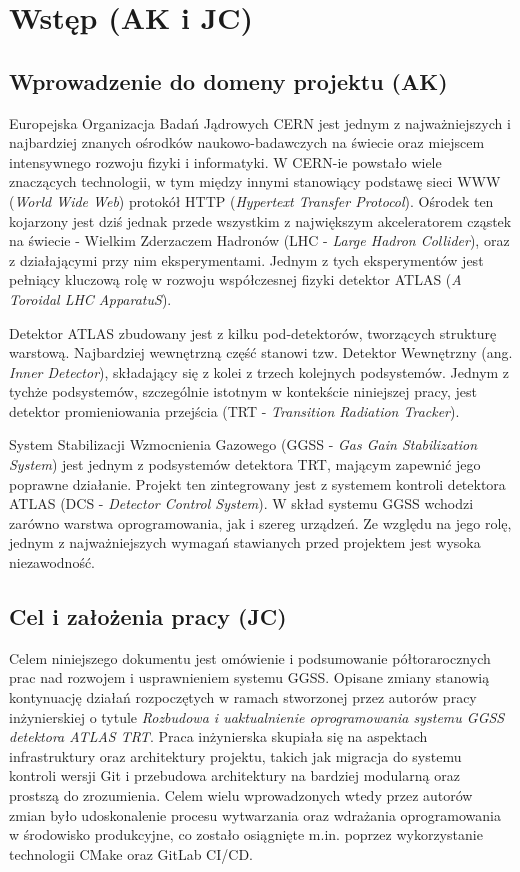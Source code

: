 \chapter{Wstęp (AK i JC)}
\label{cha:wstep}

\section{Wprowadzenie do domeny projektu (AK)}

Europejska Organizacja Badań Jądrowych CERN jest jednym z najważniejszych i najbardziej znanych ośrodków naukowo-badawczych na świecie oraz miejscem intensywnego rozwoju fizyki i informatyki. W CERN-ie powstało wiele znaczących technologii, w tym między innymi stanowiący podstawę sieci WWW (\emph{World Wide Web}) protokół HTTP (\emph{Hypertext Transfer Protocol}). Ośrodek ten kojarzony jest dziś jednak przede wszystkim z największym akceleratorem cząstek na świecie - Wielkim Zderzaczem Hadronów (LHC - \emph{Large Hadron Collider}), oraz z działającymi przy nim eksperymentami. Jednym z tych eksperymentów jest pełniący kluczową rolę w rozwoju współczesnej fizyki detektor ATLAS (\emph{A Toroidal LHC ApparatuS}).

Detektor ATLAS zbudowany jest z kilku pod-detektorów, tworzących strukturę warstową. Najbardziej wewnętrzną część stanowi tzw. Detektor Wewnętrzny (ang. \emph{Inner Detector}), składający się z kolei z trzech kolejnych podsystemów. Jednym z tychże podsystemów, szczególnie istotnym w kontekście niniejszej pracy, jest detektor promieniowania przejścia (TRT - \emph{Transition Radiation Tracker}).

System Stabilizacji Wzmocnienia Gazowego (GGSS - \emph{Gas Gain Stabilization System}) jest jednym z podsystemów detektora TRT, mającym zapewnić jego poprawne działanie. Projekt ten zintegrowany jest z systemem kontroli detektora ATLAS (DCS - \emph{Detector Control System}). W skład systemu GGSS wchodzi zarówno warstwa oprogramowania, jak i szereg urządzeń. Ze względu na jego rolę, jednym z najważniejszych wymagań stawianych przed projektem jest wysoka niezawodność.

\section{Cel i założenia pracy (JC)}
Celem niniejszego dokumentu jest omówienie i podsumowanie półtorarocznych prac nad rozwojem i usprawnieniem systemu GGSS. Opisane zmiany stanowią kontynuację działań rozpoczętych w ramach stworzonej przez autorów pracy inżynierskiej o tytule \emph{Rozbudowa i uaktualnienie oprogramowania systemu GGSS detektora ATLAS TRT}. Praca inżynierska skupiała się na aspektach infrastruktury oraz architektury projektu, takich jak migracja do systemu kontroli wersji Git i przebudowa architektury na bardziej modularną oraz prostszą do zrozumienia. Celem wielu wprowadzonych wtedy przez autorów zmian było udoskonalenie procesu wytwarzania oraz wdrażania oprogramowania w środowisko produkcyjne, co zostało osiągnięte m.in. poprzez wykorzystanie technologii CMake oraz GitLab CI/CD. 

